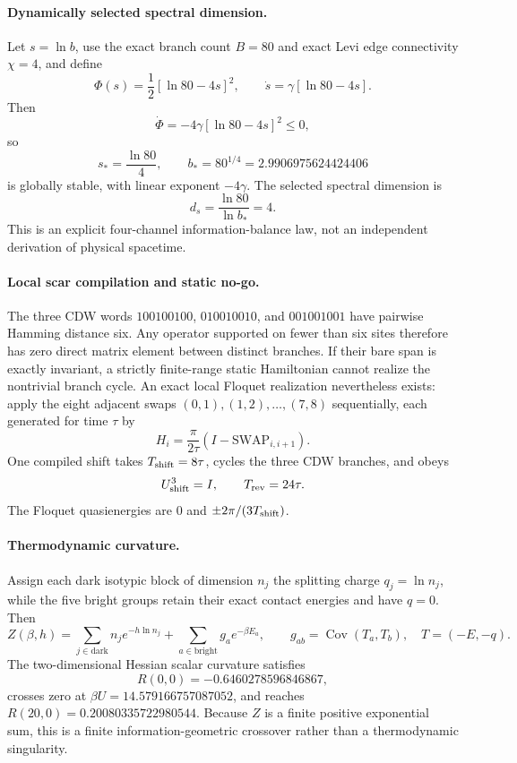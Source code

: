 \paragraph{Dynamically selected spectral dimension.}
Let $s=\ln b$, use the exact branch count $B=80$ and exact Levi edge connectivity $\chi=4$, and define
\[
 \Phi(s)=\frac12[\ln80-4s]^2,
 \qquad
 \dot s=\gamma[\ln80-4s].
\]
Then
\[
 \dot\Phi=-4\gamma[\ln80-4s]^2\le0,
\]
so
\[
 s_*=\frac{\ln80}{4},\qquad b_*=80^{1/4}=2.9906975624424406
\]
is globally stable, with linear exponent $-4\gamma$.  The selected spectral dimension is
\[
 d_s=\frac{\ln80}{\ln b_*}=4.
\]
This is an explicit four-channel information-balance law, not an independent derivation of physical spacetime.

\paragraph{Local scar compilation and static no-go.}
The three CDW words
$100100100$, $010010010$, and $001001001$ have pairwise Hamming distance six.
Any operator supported on fewer than six sites therefore has zero direct matrix element between distinct branches.
If their bare span is exactly invariant, a strictly finite-range static Hamiltonian cannot realize the nontrivial branch cycle.
An exact local Floquet realization nevertheless exists: apply the eight adjacent swaps $(0,1),(1,2),\ldots,(7,8)$ sequentially, each generated for time $\tau$ by
\[
 H_i=\frac{\pi}{2\tau}(I-\mathrm{SWAP}_{i,i+1}).
\]
One compiled shift takes $T_{\rm shift}=8\tau$, cycles the three CDW branches, and obeys
\[
 U_{\rm shift}^{3}=I,
 \qquad T_{\rm rev}=24\tau.
\]
The Floquet quasienergies are $0$ and $\pm2\pi/(3T_{\rm shift})$.

\paragraph{Thermodynamic curvature.}
Assign each dark isotypic block of dimension $n_j$ the splitting charge $q_j=\ln n_j$, while the five bright groups retain their exact contact energies and have $q=0$.  Then
\[
 Z(\beta,h)=\sum_{j\in\mathrm{dark}}n_j e^{-h\ln n_j}
 +\sum_{a\in\mathrm{bright}}g_a e^{-\beta E_a},
 \qquad g_{ab}=\operatorname{Cov}(T_a,T_b),\quad T=(-E,-q).
\]
The two-dimensional Hessian scalar curvature satisfies
\[
 R(0,0)=-0.6460278596846867,
\]
crosses zero at $\beta U=14.579166757087052$, and reaches
$R(20,0)=0.20080335722980544$.
Because $Z$ is a finite positive exponential sum, this is a finite information-geometric crossover rather than a thermodynamic singularity.

